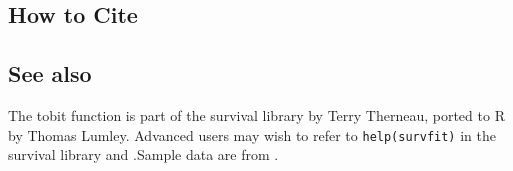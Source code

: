 \subsection*{How to Cite}


\subsection*{See also}
The tobit function is part of the survival library by Terry
Therneau, ported to R by Thomas Lumley.  Advanced users may wish to
refer to \texttt{help(survfit)} in the survival library and
\cite{VenRip02}.Sample data are from \cite{KinAltBur90}.
